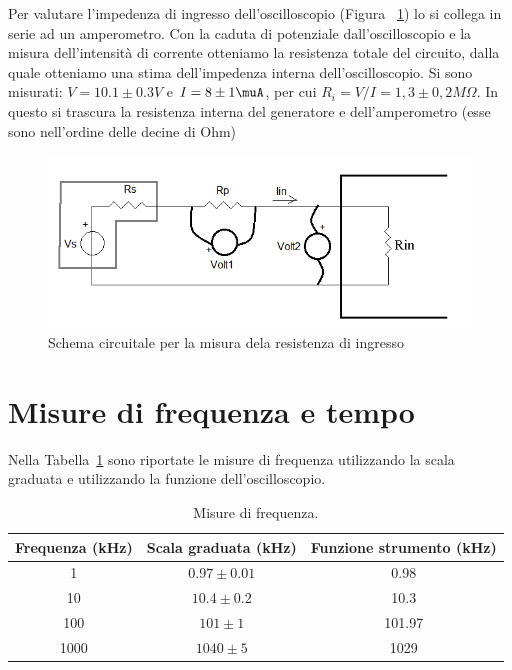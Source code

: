\documentclass[10pt,a4paper]{article}
\begin{document}
Per valutare l'impedenza di ingresso dell'oscilloscopio (Figura ~\ref{t:par4})  lo si collega in serie ad un amperometro. Con la caduta di potenziale dall'oscilloscopio e la misura dell'intensità di corrente otteniamo la resistenza totale del circuito, dalla quale otteniamo una stima dell'impedenza interna dell'oscilloscopio. Si sono misurati: $V = 10.1 \pm 0.3V$ e $I = 8 \pm 1 \muA$, per cui $R_i = V/I = 1,3 \pm 0,2 M\Omega$.
In questo si trascura la resistenza interna del generatore e dell'amperometro (esse sono nell'ordine delle decine di Ohm)

\begin{figure}
\centering
\includegraphics[scale=0.8]{resistenzaIngresso.png}
\caption{Schema circuitale per la misura dela resistenza di ingresso\label{t:par4}}
\end{figure}


\section{Misure di frequenza e tempo}

Nella Tabella~\ref{t:par5} sono riportate le misure di frequenza utilizzando la scala graduata e utilizzando la funzione dell'oscilloscopio.
\begin{table}[h]
\centering
\begin{tabular}{|c|c|c|}
\hline 
Frequenza (kHz) & Scala graduata (kHz) & Funzione strumento (kHz) \\

\hline 

1&$ 0.97 \pm 0.01$  &0.98\\
10& $10.4 \pm 0.2$ &10.3\\
100& $101 \pm 1$ &101.97\\
1000& $1040 \pm 5$ &1029\\

\hline 
\end{tabular} 
\caption{Misure di frequenza.\label{t:par5}}
\end{table}
\end{document}
